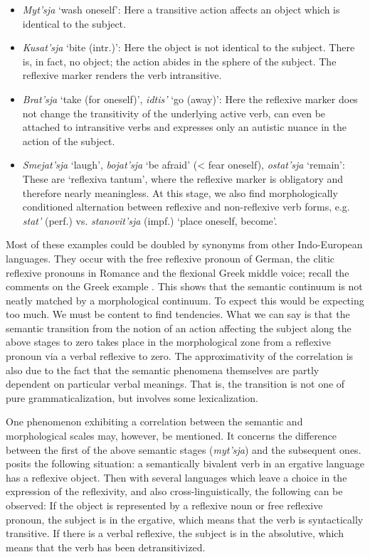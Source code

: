 \begin{itemize}

\item[] \textit{Myt'sja} ‘wash oneself’: Here a transitive action affects an object which is identical to the subject.

\item[] \textit{Kusat'sja} ‘bite (intr.)’: Here the object is not identical to the subject. There is, in fact, no object; the action abides in the sphere of the subject. The reflexive marker renders the verb intransitive.

\item[] \textit{Brat'sja} ‘take (for oneself)’, \textit{idtis'} ‘go (away)’: Here the reflexive marker does not change the transitivity of the underlying active verb, can even be attached to intransitive verbs and expresses only an autistic nuance in the action of the subject.

\item[] \textit{Smejat'sja} ‘laugh’, \textit{bojat'sja} ‘be afraid’ ({\textless} fear oneself), \textit{ostat'sja} ‘remain’: These are ‘reflexiva tantum’, where the reflexive marker is obligatory and therefore nearly meaningless. At this stage, we also find morphologically conditioned alternation between reflexive and non-reflexive verb forms, e.g. \textit{stat'} (perf.) vs. \textit{stanovit'sja} (impf.) ‘place oneself, become’.

\end{itemize}

\noindent Most of these examples could be doubled by synonyms from other Indo-European languages. They occur with the free reflexive pronoun of German, the clitic reflexive pronouns in Romance and the flexional Greek middle voice; recall the comments on the Greek example . This shows that the semantic continuum is not neatly matched by a morphological continuum. To expect this would be expecting too much. We must be content to find tendencies. What we can say is that the semantic transition from the notion of an action affecting the subject along the above stages to zero takes place in the morphological zone from a reflexive pronoun via a verbal reflexive to zero. The approximativity of the correlation is also due to the fact that the semantic phenomena themselves are partly dependent on particular verbal meanings. That is, the transition is not one of pure grammaticalization, but involves some lexicalization.

One phenomenon exhibiting a correlation between the semantic and morphological scales may, however, be mentioned. It concerns the difference between the first of the above semantic stages (\textit{myt'sja}) and the subsequent ones. \citet[646f]{Edmondson1978} posits the following situation: a semantically bivalent verb in an ergative language has a reflexive object. Then with several languages which leave a choice in the expression of the reflexivity, and also cross-linguistically, the following can be observed: If the object is represented by a reflexive noun or free reflexive pronoun, the subject is in the ergative, which means that the verb is syntactically transitive. If there is a verbal reflexive, the subject is in the absolutive, which means that the verb has been detransitivized.

